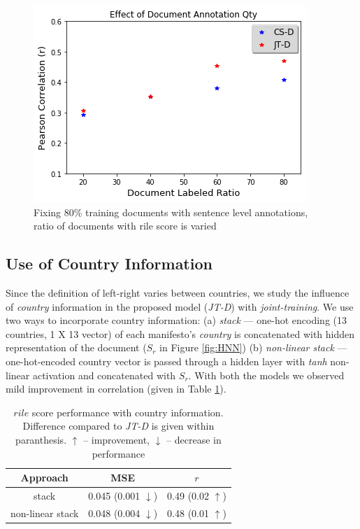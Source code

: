 \documentclass[11pt,a4paper]{article}
\begin{document}
\begin{figure}[!ht]
\centering
  \includegraphics[width=0.9\linewidth]{Plot2.png}
  \caption{Fixing 80\% training documents with sentence level annotations, ratio of documents with rile score is varied}
 \label{fig:docl}
 \end{figure}
 
\subsection{Use of Country Information}
Since the definition of left-right varies between countries, we study the influence of \textit{country} information in the proposed model (\textit{JT-D}) with \textit{joint-training}. We use two ways to incorporate country information: (a) \textit{stack} --- one-hot encoding (13 countries, 1 X 13 vector) of each manifesto's \textit{country} is concatenated with hidden representation of the document ($S_{r}$ in Figure \ref{fig:HNN}) (b) \textit{non-linear stack} --- one-hot-encoded country vector is passed through a hidden layer with \textit{tanh} non-linear activation and concatenated with $S_{r}$. With both the models we observed mild improvement in correlation (given in Table \ref{tab:al}).

 \begin{table}[H]
  \centering
  \begin{tabular}{ c c c }
  \toprule
    Approach & MSE & $r$\\
    \midrule
    stack &  0.045 (0.001 $\downarrow$) & 0.49 (0.02 $\uparrow$) \\
    non-linear stack &  0.048 (0.004 $\downarrow$) & 0.48 (0.01 $\uparrow$) \\
    \bottomrule
  \end{tabular}
  \caption{$rile$ score performance with country information. Difference compared to \textit{JT-D} is given within paranthesis. $\uparrow$ -- improvement, $\downarrow$ -- decrease in performance}
  \label{tab:al}
\end{table}
\end{document}
